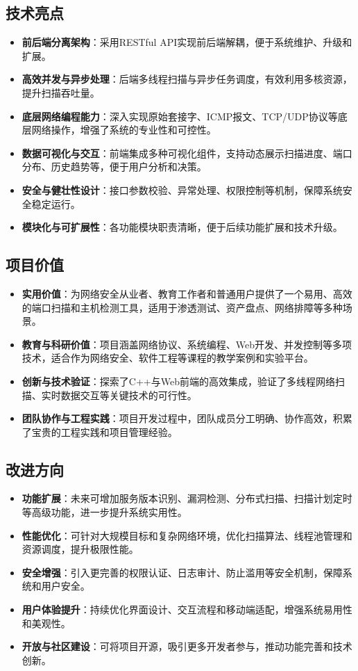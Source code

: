 \documentclass[12pt,hyperref,a4paper,UTF8]{ctexart}
\begin{document}
\subsection{技术亮点}
\begin{itemize}
    \item \textbf{前后端分离架构}：采用RESTful API实现前后端解耦，便于系统维护、升级和扩展。
    \item \textbf{高效并发与异步处理}：后端多线程扫描与异步任务调度，有效利用多核资源，提升扫描吞吐量。
    \item \textbf{底层网络编程能力}：深入实现原始套接字、ICMP报文、TCP/UDP协议等底层网络操作，增强了系统的专业性和可控性。
    \item \textbf{数据可视化与交互}：前端集成多种可视化组件，支持动态展示扫描进度、端口分布、历史趋势等，便于用户分析和决策。
    \item \textbf{安全与健壮性设计}：接口参数校验、异常处理、权限控制等机制，保障系统安全稳定运行。
    \item \textbf{模块化与可扩展性}：各功能模块职责清晰，便于后续功能扩展和技术升级。
\end{itemize}

\subsection{项目价值}
\begin{itemize}
    \item \textbf{实用价值}：为网络安全从业者、教育工作者和普通用户提供了一个易用、高效的端口扫描和主机检测工具，适用于渗透测试、资产盘点、网络排障等多种场景。
    \item \textbf{教育与科研价值}：项目涵盖网络协议、系统编程、Web开发、并发控制等多项技术，适合作为网络安全、软件工程等课程的教学案例和实验平台。
    \item \textbf{创新与技术验证}：探索了C++与Web前端的高效集成，验证了多线程网络扫描、实时数据交互等关键技术的可行性。
    \item \textbf{团队协作与工程实践}：项目开发过程中，团队成员分工明确、协作高效，积累了宝贵的工程实践和项目管理经验。
\end{itemize}

\subsection{改进方向}
\begin{itemize}
    \item \textbf{功能扩展}：未来可增加服务版本识别、漏洞检测、分布式扫描、扫描计划定时等高级功能，进一步提升系统实用性。
    \item \textbf{性能优化}：可针对大规模目标和复杂网络环境，优化扫描算法、线程池管理和资源调度，提升极限性能。
    \item \textbf{安全增强}：引入更完善的权限认证、日志审计、防止滥用等安全机制，保障系统和用户安全。
    \item \textbf{用户体验提升}：持续优化界面设计、交互流程和移动端适配，增强系统易用性和美观性。
    \item \textbf{开放与社区建设}：可将项目开源，吸引更多开发者参与，推动功能完善和技术创新。
\end{itemize}
\end{document}
